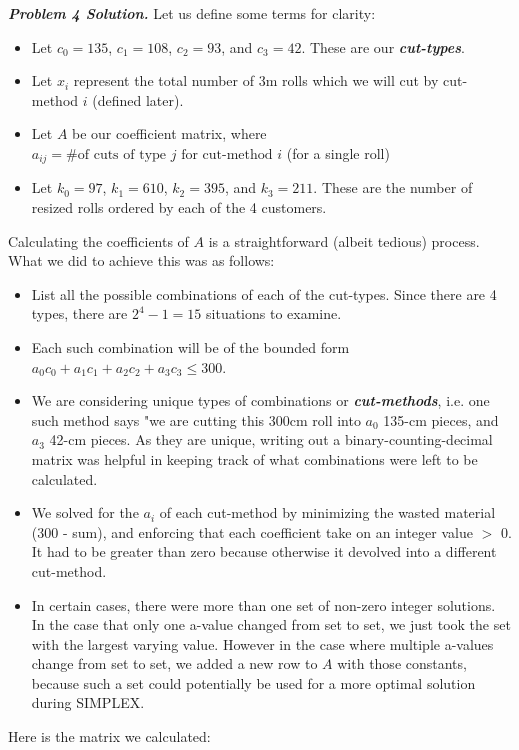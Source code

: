 \documentclass[10pt, letterpaper, twosided]{article}
\begin{document}
\emph{\textbf{Problem 4 Solution.}} Let us define some terms for clarity:
\begin{itemize}
\item Let $c_0 = 135$, $c_1 = 108$, $c_2 = 93$, and $c_3 = 42$.  These are our \emph{\textbf{cut-types}}.
\item Let $x_i$ represent the total number of 3m rolls which we will cut by cut-method $i$ (defined later).
\item Let $A$ be our coefficient matrix, where $a_{ij} = \text{\# of cuts of type } j \text{ for cut-method } i$ (for a single roll)
\item Let $k_0 = 97$, $k_1 = 610$, $k_2 = 395$, and $k_3 = 211$.  These are the number of resized rolls ordered by each of the 4 customers.
\end{itemize}
Calculating the coefficients of $A$ is a straightforward (albeit tedious) process. What we did to achieve this was as follows:
\begin{itemize}
\item List all the possible combinations of each of the cut-types.  Since there are 4 types, there are $2^4 - 1 = 15$ situations to examine.
\item Each such combination will be of the bounded form $a_0c_0 + a_1c_1 + a_2c_2 + a_3c_3 \leq 300$.  
\item We are considering unique types of combinations or \emph{\textbf{cut-methods}}, i.e. one such method says "we are cutting this 300cm roll into $a_0$ 135-cm pieces, and $a_3$ 42-cm pieces.  As they are unique, writing out a binary-counting-decimal matrix was helpful in keeping track of what combinations were left to be calculated.
\item We solved for the $a_i$ of each cut-method by minimizing the wasted material (300 - sum), and enforcing that each coefficient take on an integer value $>$ 0.  It had to be greater than zero because otherwise it devolved into a different cut-method.  
\item In certain cases, there were more than one set of non-zero integer solutions.  In the case that only one a-value changed from set to set, we just took the set with the largest varying value.  However in the case where multiple a-values change from set to set, we added a new row to $A$ with those constants, because such a set could potentially be used for a more optimal solution during SIMPLEX.
\end{itemize}
Here is the matrix we calculated:
\end{document}
